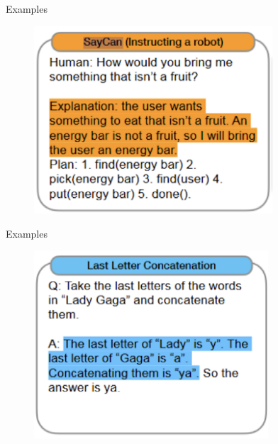 \begin{vbframe}{Examples}

\vfill

\begin{figure}
    \centering
    \includegraphics[height=7cm]{figure/cotex4.png}
\end{figure}

\vfill

\end{vbframe}

\begin{vbframe}{Examples}

\vfill

\begin{figure}
    \centering
    \includegraphics[height=7cm]{figure/cotex5.png}
\end{figure}

\vfill

\end{vbframe}

